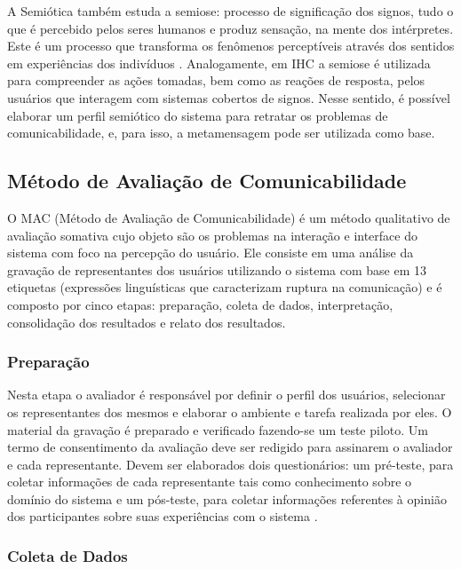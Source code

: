 \indent A Semiótica também estuda a semiose: processo de significação dos signos, tudo o que é percebido pelos seres humanos e produz sensação, na mente dos intérpretes. Este é um processo que transforma os fenômenos perceptíveis através dos sentidos em experiências dos indivíduos \cite{semiose01}. Analogamente, em IHC a semiose é utilizada para compreender as ações tomadas, bem como as reações de resposta, pelos usuários que interagem com sistemas cobertos de signos. Nesse sentido, é possível elaborar um perfil semiótico do sistema para retratar os problemas de comunicabilidade, e, para isso, a metamensagem pode ser utilizada como base.


\subsection{Método de Avaliação de Comunicabilidade} \label{MAC}

\indent O MAC (Método de Avaliação de Comunicabilidade) é um método qualitativo de avaliação somativa cujo objeto são os problemas na interação e interface do sistema com foco na percepção do usuário. Ele consiste em uma análise da gravação de representantes dos usuários utilizando o sistema com base em 13 etiquetas (expressões linguísticas que caracterizam ruptura na comunicação) e é composto por cinco etapas: preparação, coleta de dados, interpretação, consolidação dos resultados e relato dos resultados.

\subsubsection{Preparação}

\indent Nesta etapa o avaliador é responsável por definir o perfil dos usuários, selecionar os representantes dos mesmos e elaborar o ambiente e tarefa realizada por eles. O material da gravação é preparado e verificado fazendo-se um teste piloto. Um termo de consentimento da avaliação deve ser redigido para assinarem o avaliador e cada representante. \cite[p. 305]{IHCbook} Devem ser elaborados dois questionários: um pré-teste, para coletar informações de cada representante tais como conhecimento sobre o domínio do sistema e um pós-teste, para coletar informações referentes à opinião dos participantes sobre suas experiências com o sistema \cite[p. 306]{IHCbook}.

\subsubsection{Coleta de Dados}

